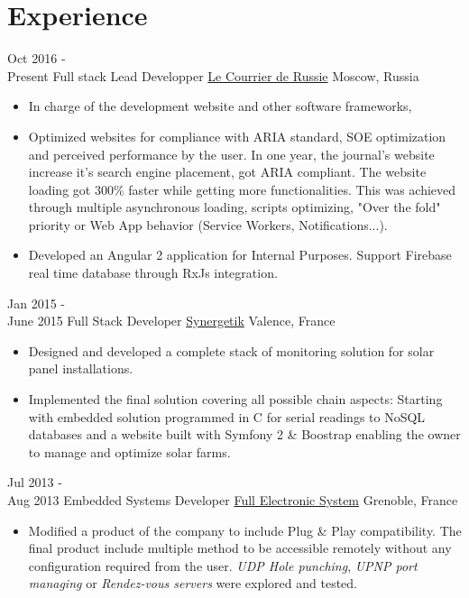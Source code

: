 \documentclass[a4paper]{template} %
\begin{document}
\section{Experience}

\begin{twenty} %
    \twentyitem
   		{Oct 2016 - \\ Present}
        {Full stack Lead Developper}
        {\href{http://www.lecourrierderussie.com}{Le Courrier de Russie}}
        {Moscow, Russia}
        {
        {\begin{itemize}
        \item In charge of the development website and other software frameworks,
        \item Optimized websites for compliance with ARIA standard, SOE optimization and perceived performance by the user. In one year, the journal's website increase it's search engine placement, got ARIA compliant. The website loading got 300\% faster while getting more functionalities. This was achieved through multiple asynchronous loading, scripts optimizing, "Over the fold" priority or Web App behavior (Service Workers, Notifications...).
        \item Developed an Angular 2 application for Internal Purposes. Support Firebase real time database through RxJs integration.
    \end{itemize}}
        }

     \twentyitem
   		{Jan 2015 - \\ June 2015}
        {Full Stack Developer}
        {\href{http://synergetik.fr/}{Synergetik}}
        {Valence, France}
        {
        \begin{itemize}
        \item Designed and developed a complete stack of monitoring solution for solar panel installations.
        \item Implemented the final solution covering all possible chain aspects: Starting with embedded solution programmed in C for serial readings to NoSQL databases and a website built with Symfony 2 \& Boostrap enabling the owner to manage and optimize solar farms.
    \end{itemize}
    	}

    	\twentyitem
   		{Jul 2013 - \\ Aug 2013}
        {Embedded Systems Developer}
        {\href{http://www.fesys.fr/fr}{Full Electronic System}}
        {Grenoble, France}
        {
        \begin{itemize}
        \item Modified a product of the company to include Plug \& Play compatibility. The final product include multiple method to be accessible remotely without any configuration required from the user. \textit{UDP Hole punching}, \textit{UPNP port managing} or \textit{Rendez-vous servers} were explored and tested.
    \end{itemize}
    	}

\end{twenty}
\end{document}
